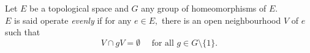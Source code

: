 \documentclass[12pt]{article}
\begin{document}

\begin{defn}
	Let $E$ be a topological space and $G$ any group of homeomorphisms of $E.$\\
	$E$ is said operate \emph{evenly} if for any $e \in E,$ there is an open neighbourhood $V$ of $e$ such that
	\begin{equation*} 
		V \cap gV = \emptyset \quad \text{ for all } g \in G\setminus\{1\}.
	\end{equation*}
\end{defn}
\end{document}
